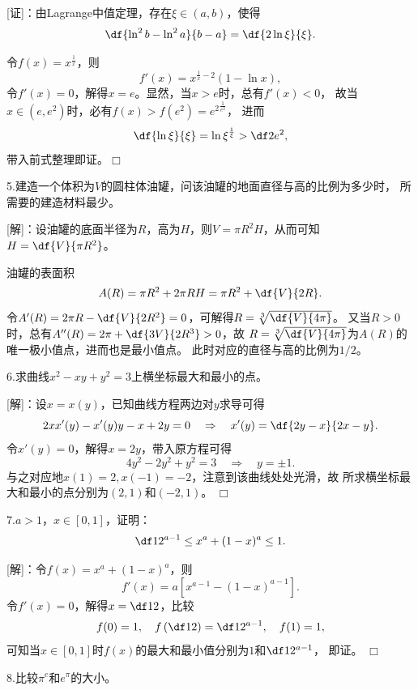 [证]：由Lagrange中值定理，存在$\xi\in(a,b)$，使得
$$\df{\ln^2b-\ln^2a}{b-a}=\df{2\ln\xi}{\xi}.$$

令$f(x)=x^{\frac1x}$，则
$$f'(x)=x^{\frac1x-2}(1-\ln x),$$
令$f'(x)=0$，解得$x=e$。显然，当$x>e$时，总有$f'(x)<0$，
故当$x\in(e,e^2)$时，必有$f(x)>f(e^2)={e^2}^{\frac1{e^2}}$，
进而
$$\df{\ln\xi}{\xi}=\ln\xi^{\frac1{\xi}}>\df2{e^2},$$
带入前式整理即证。\hfill$\Box$

\bigskip

5.建造一个体积为$V$的圆柱体油罐，问该油罐的地面直径与高的比例为多少时，
所需要的建造材料最少。

[解]：设油罐的底面半径为$R$，高为$H$，则$V=\pi R^2H$，从而可知
$H=\df{V}{\pi R^2}$。

油罐的表面积
$$A(R)=\pi R^2+2\pi RH=\pi R^2+\df{V}{2R}.$$
令$A'(R)=2\pi R-\df{V}{2R^2}=0$，可解得$R=\sqrt[3]{\df{V}{4\pi}}$。
又当$R>0$时，总有$A''(R)=2\pi+\df{3V}{2R^3}>0$，故
$R=\sqrt[3]{\df{V}{4\pi}}$为$A(R)$的唯一极小值点，进而也是最小值点。
此时对应的直径与高的比例为$1/2$。\fin

\bigskip

6.求曲线$x^2-xy+y^2=3$上横坐标最大和最小的点。

[解]：设$x=x(y)$，已知曲线方程两边对$y$求导可得
$$2xx'(y)-x'(y)y-x+2y=0
\quad\Rightarrow\quad
x'(y)=\df{2y-x}{2x-y}.$$
令$x'(y)=0$，解得$x=2y$，带入原方程可得
$$4y^2-2y^2+y^2=3
\quad\Rightarrow\quad
y=\pm1.$$
与之对应地$x(1)=2,x(-1)=-2$，注意到该曲线处处光滑，故
所求横坐标最大和最小的点分别为$(2,1)$和$(-2,1)$。
\hfill$\Box$

\bigskip

7.$a>1$，$x\in[0,1]$，证明：
$$\df1{2^{a-1}}\leq x^a+(1-x)^a\leq 1.$$

[解]：令$f(x)=x^a+(1-x)^a$，则
$$f'(x)=a[x^{a-1}-(1-x)^{a-1}].$$
令$f'(x)=0$，解得$x=\df12$，比较
$$f(0)=1,\quad f\left(\df12\right)=\df1{2^{a-1}},
\quad f(1)=1,$$
可知当$x\in[0,1]$时$f(x)$的最大和最小值分别为$1$和$\df1{2^{a-1}}$，
即证。
\hfill$\Box$

\bigskip

8.比较$\pi^e$和$e^{\pi}$的大小。


